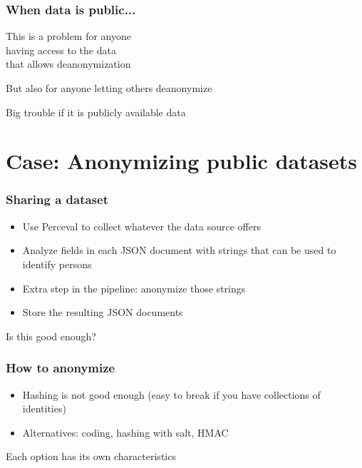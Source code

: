 \documentclass[17pt,aspectratio=169,hyperref={pdfusetitle,colorlinks,allcolors=olive}]{beamer}
\begin{document}
\begin{frame}[fragile]
  \frametitle{When data is public...}

  This is a problem for anyone \\
  having access to the data \\
  that allows deanonymization \\

  \vspace{.5cm}
  
  But also for anyone letting others deanonymize \\

  \vspace{.5cm}
  
  Big trouble if it is publicly available data \\
  
\end{frame}

\section{Case: Anonymizing public datasets}

\begin{frame}[fragile]
  \frametitle{Sharing a dataset}

  \begin{itemize}
  \item Use Perceval to collect whatever the data source offers
  \item Analyze fields in each JSON document with strings that can be used to identify persons
  \item Extra step in the pipeline: anonymize those strings
  \item Store the resulting JSON documents
  \end{itemize}

  \begin{center}
    Is this good enough?
  \end{center}
\end{frame}


\begin{frame}[fragile]
  \frametitle{How to anonymize}

  \begin{itemize}
  \item Hashing is not good enough (easy to break if you have collections of identities)
  \item Alternatives: coding, hashing with salt, HMAC
  \end{itemize}

  \begin{center}
    Each option has its own characteristics
  \end{center}
\end{frame}
\end{document}
